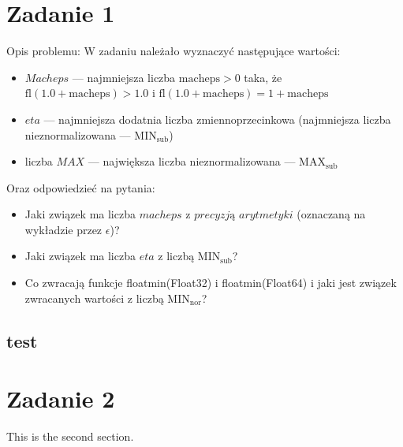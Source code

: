 \documentclass{article}
\begin{document}
\section{Zadanie 1}
Opis problemu:
W zadaniu należało wyznaczyć następujące wartości:
\begin{itemize}
    \item $Macheps$ --- najmniejsza liczba $\mathrm{macheps}>0$ taka, że $\mathrm{fl}(1.0+\mathrm{macheps})>1.0$ i $\mathrm{fl}(1.0+\mathrm{macheps})=1+\mathrm{macheps}$
    \item $eta$ --- najmniejsza dodatnia liczba zmiennoprzecinkowa (najmniejsza liczba nieznormalizowana --- $\mathrm{MIN}_{\mathrm{sub}}$)
    \item liczba $MAX$ --- największa liczba nieznormalizowana --- $\mathrm{MAX}_{\mathrm{sub}}$
\end{itemize}
Oraz odpowiedzieć na pytania:
\begin{itemize}
    \item Jaki związek ma liczba $macheps$ z $precyzją$ $arytmetyki$ (oznaczaną na wykładzie przez $\epsilon$)?
    \item Jaki związek ma liczba $eta$ z liczbą $\mathrm{MIN}_{\mathrm{sub}}$?
    \item Co zwracają funkcje floatmin(Float32) i floatmin(Float64) i jaki jest związek zwracanych wartości z liczbą $\mathrm{MIN}_{\mathrm{nor}}$?
\end{itemize}
\subsection{test}
\section{Zadanie 2}
This is the second section.
\end{document}
